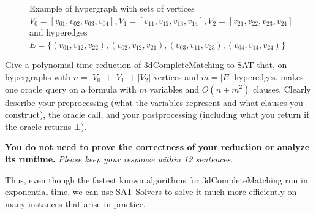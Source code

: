 \documentclass[11pt]{article}
\begin{document}
\begin{enumerate}
\begin{figure}[h]

\caption{\centering Example of hypergraph with sets of vertices $V_0 = [v_{01}, v_{02}, v_{03}, v_{04}], V_1 = [v_{11}, v_{12}, v_{13}, v_{14}], V_2 = [v_{21}, v_{22}, v_{23}, v_{24}]$ and hyperedges $E = \{(v_{01}, v_{12}, v_{22}), (v_{02}, v_{12}, v_{21}), (v_{03}, v_{11}, v_{23}), (v_{04}, v_{14}, v_{24})\}$}
\end{figure}

Give a polynomial-time reduction of 3dCompleteMatching to SAT that, on hypergraphs with $n=|V_0|+|V_1|+|V_2|$ vertices and $m=|E|$ hyperedges, makes one oracle query on a formula with $m$ variables and $O(n + m^2)$ clauses. Clearly describe your preprocessing (what the variables represent and what clauses you construct), the oracle call, and your postprocessing (including what you return if the oracle returns $\bot$).

\textbf{You do not need to prove the correctness of your reduction or analyze its runtime.} \emph{Please keep your response within 12 sentences.}

Thus, even though the fastest known algorithms for 3dCompleteMatching run in exponential time, we can use SAT Solvers to solve it much more efficiently on many instances that arise in practice.


\end{enumerate}
\end{document}
